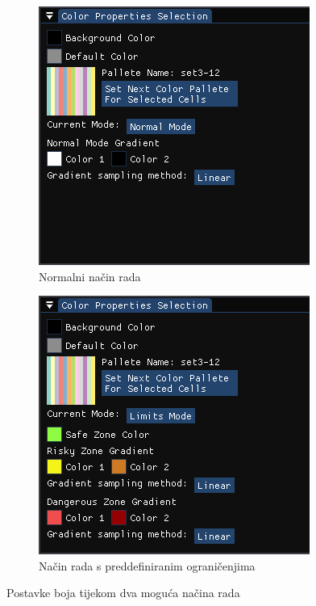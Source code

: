 \documentclass[times, utf8, diplomski]{fer}
\begin{document}
\begin{figure} [H]
     \centering
     \begin{subfigure}[h]{0.49\textwidth}
         \centering
         \includegraphics[width=\textwidth]{color_settings_normal_mode.png}
         \caption{Normalni način rada}
         \label{fig:color-settings-normal-mode}
     \end{subfigure}
     \hfill
     \begin{subfigure}[h]{0.49\textwidth}
         \centering
         \includegraphics[width=\textwidth]{color_settings_limits_mode.png}
         \caption{Način rada s preddefiniranim ograničenjima}
         \label{fig:color-settings-limits-mode}
     \end{subfigure}
     \caption{Postavke boja tijekom dva moguća načina rada}
     \label{fig:color-settings-2-modes}
\end{figure}
\end{document}
